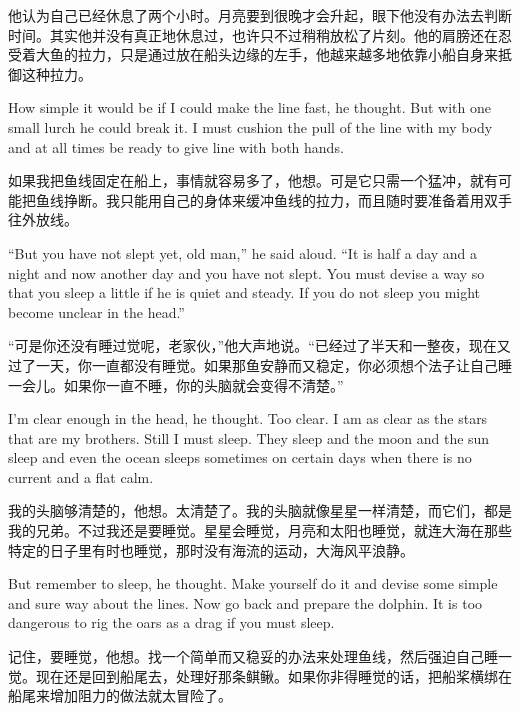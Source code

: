 \begin{paracol}{2}
\switchcolumn

他认为自己已经休息了两个小时。月亮要到很晚才会升起，眼下他没有办法去判断时间。其实他并没有真正地休息过，也许只不过稍稍放松了片刻。他的肩膀还在忍受着大鱼的拉力，只是通过放在船头边缘的左手，他越来越多地依靠小船自身来抵御这种拉力。

\switchcolumn*

How simple it would be if I could make the line fast, he thought. But with
one small lurch he could break it. I must \gls{cushion} the pull of the line
with my body and at all times be ready to give line with both hands.

\switchcolumn

如果我把鱼线固定在船上，事情就容易多了，他想。可是它只需一个猛冲，就有可能把鱼线挣断。我只能用自己的身体来缓冲鱼线的拉力，而且随时要准备着用双手往外放线。

\switchcolumn*

``But you have not slept yet, old man,'' he said aloud. ``It is half a day
and a night and now another day and you have not slept. You must
\gls{devise} a way so that you sleep a little if he is quiet and steady. If
you do not sleep you might become unclear in the head.''

\switchcolumn

“可是你还没有睡过觉呢，老家伙，”他大声地说。“已经过了半天和一整夜，现在又过了一天，你一直都没有睡觉。如果那鱼安静而又稳定，你必须想个法子让自己睡一会儿。如果你一直不睡，你的头脑就会变得不清楚。”

\switchcolumn*

I'm clear enough in the head, he thought. Too clear. I am as clear as the
stars that are my brothers. Still I must sleep. They sleep and the moon and
the sun sleep and even the ocean sleeps sometimes on certain days when there
is no current and a flat calm.

\switchcolumn

我的头脑够清楚的，他想。太清楚了。我的头脑就像星星一样清楚，而它们，都是我的兄弟。不过我还是要睡觉。星星会睡觉，月亮和太阳也睡觉，就连大海在那些特定的日子里有时也睡觉，那时没有海流的运动，大海风平浪静。

\switchcolumn*

But remember to sleep, he thought. Make yourself do it and devise some
simple and sure way about the lines. Now go back and prepare the dolphin. It
is too dangerous to \gls{rig} the oars as a drag if you must sleep.

\switchcolumn

记住，要睡觉，他想。找一个简单而又稳妥的办法来处理鱼线，然后强迫自己睡一觉。现在还是回到船尾去，处理好那条鲯鳅。如果你非得睡觉的话，把船桨横绑在船尾来增加阻力的做法就太冒险了。


\end{paracol}
